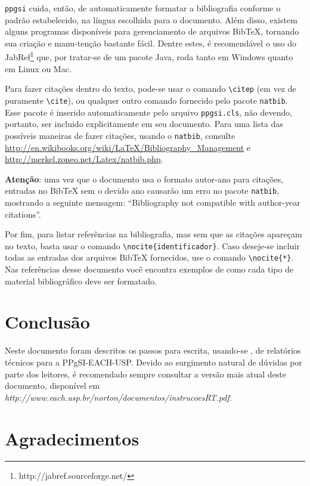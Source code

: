 \documentclass[12pt,a4paper,utf8]{ppgsi}
\newcommand{\BibTeX}{{\sc Bib}\TeX} %
\begin{document}
	\verb|ppgsi| cuida, então, de automaticamente formatar a bibliografia conforme o padrão estabelecido, na língua escolhida para o documento. Além disso, existem alguns programas disponíveis para gerenciamento de arquivos \BibTeX{}, tornando sua criação e manu-tenção bastante fácil. Dentre estes, é recomendável o uso do JabRef\footnote{http://jabref.sourceforge.net/} que, por tratar-se de um pacote Java, roda tanto em Windows quanto em Linux ou Mac.
	
	Para fazer citações dentro do texto, pode-se usar o comando \verb|\citep| (em vez de puramente \verb|\cite|), ou qualquer outro comando fornecido pelo pacote \verb|natbib|. Esse pacote é inserido automaticamente pelo arquivo \verb|ppgsi.cls|, não devendo, portanto, ser incluido explicitamente em seu documento. Para uma lista das possíveis maneiras de fazer citações, usando o \verb|natbib|, consulte \url{http://en.wikibooks.org/wiki/LaTeX/Bibliography_Management} e \url{http://merkel.zoneo.net/La}\linebreak\url{tex/natbib.php}.
	
	\textbf{Atenção}: uma vez que o documento usa o formato autor-ano para citações, entradas no \BibTeX{} sem o devido ano causarão um erro no pacote \verb|natbib|, mostrando a seguinte mensagem: ``Bibliography not compatible with author-year citations''.
	
	Por fim, para listar referências na bibliografia, mas sem que as citações apareçam no texto, basta usar o comando \verb|\nocite{identificador}|. Caso deseje-se incluir todas as entradas dos arquivos \BibTeX{} fornecidos, use o comando \verb|\nocite{*}|. Nas referências desse documento você encontra exemplos de como cada tipo de material bibliográfico deve ser formatado.	
	
	\nocite{Back1997}
	\nocite{Cichocki1993}
	\nocite{Romero1996}
	\nocite{Bourdieu1977}
	\nocite{aveiro2010}
	\nocite{Romero1993}


\section{Conclusão}

	Neste documento foram descritos os passos para escrita, usando-se \LaTeXe{}, de relatórios técnicos para a PPgSI-EACH-USP. Devido ao surgimento natural de dúvidas por parte dos leitores, é recomendado sempre consultar a versão mais atual deste documento, disponível em \textit{http://www.each.usp.br/norton/documentos/instrucoesRT.pdf}.

	
\section*{Agradecimentos}
\end{document}
